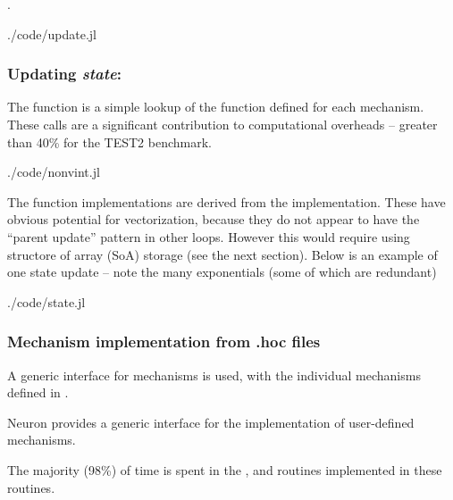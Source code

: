 .

\begin{shaded}
 {./code/update.jl}
\end{shaded}
\subsubsection{Updating \emph{state}: }
The  function is a simple lookup of the  function defined for each mechanism. These calls are a significant contribution to computational overheads -- greater than 40\% for the TEST2 benchmark.

\begin{shaded}
 {./code/nonvint.jl}
\end{shaded}

The  function implementations are derived from the  implementation. These have obvious potential for vectorization, because they do not appear to have the ``parent update'' pattern in other loops. However this would require using structore of array (SoA) storage (see the next section). Below is an example of one state update -- note the many exponentials (some of which are redundant)

\begin{shaded}
 {./code/state.jl}
\end{shaded}

\subsubsection{Mechanism implementation from .hoc files}
A generic interface for mechanisms is used, with the individual mechanisms defined in .

Neuron provides a generic interface for the implementation of user-defined mechanisms.

The majority (98\%) of time is spent in the ,  and  routines implemented in these routines.


